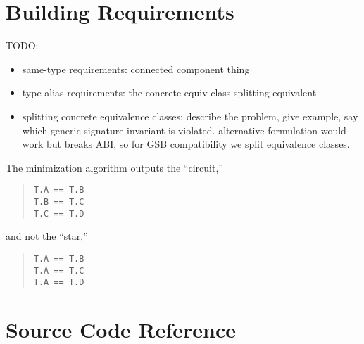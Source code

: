 \documentclass[../generics]{subfiles}
\begin{document}
\section[]{Building Requirements}\label{requirement builder}

\ifWIP


TODO:
\begin{itemize}
\item same-type requirements: connected component thing
\item type alias requirements: the concrete equiv class splitting equivalent
\item splitting concrete equivalence classes: describe the problem, give example, say which generic signature invariant is violated. alternative formulation would work but breaks ABI, so for GSB compatibility we split equivalence classes.
\end{itemize}

The minimization algorithm outputs the ``circuit,''
\begin{quote}
\begin{verbatim}
T.A == T.B
T.B == T.C
T.C == T.D
\end{verbatim}
\end{quote}
and not the ``star,''
\begin{quote}
\begin{verbatim}
T.A == T.B
T.A == T.C
T.A == T.D
\end{verbatim}
\end{quote}

\fi

\section[]{Source Code Reference}\label{rqm minimization source ref}
\end{document}
